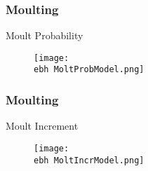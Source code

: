 \documentclass{beamer}
\newcommand{\ebh}{\string~/bio.data/bio.lobster/figures/LFA2733Framework2018/} %
\begin{document}



\begin{frame}
\frametitle{Moulting}
Moult Probability 
\begin{figure}
        \begin{center}
            \texttt{[image: \\ebh MoltProbModel.png]}
        \end{center}
    \end{figure}
\end{frame}





\begin{frame}
\frametitle{Moulting}
Moult Increment 
\begin{figure}
        \begin{center}
            \texttt{[image: \\ebh MoltIncrModel.png]}
        \end{center}
    \end{figure}
\end{frame}
\end{document}
